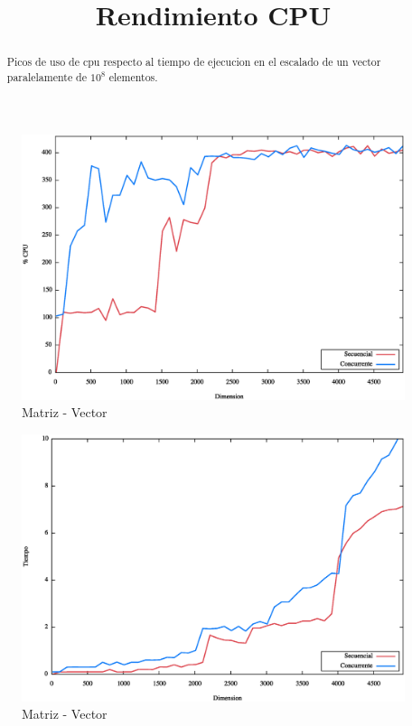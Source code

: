 
\title{Rendimiento CPU}


\maketitle
\begin{abstract}
    \centering
    Picos de uso de cpu respecto al tiempo de ejecucion en el escalado de un vector paralelamente de $10^8$ elementos.
\end{abstract}
\begin{figure}[!htb]
    \centering
    \includegraphics[scale=.5]{vectordimensioncpu.eps}
    \caption{Matriz - Vector}
    \label{fig:digraph}
\end{figure}
\begin{figure}[!htb]
    \centering
    \includegraphics[scale=.5]{vectordimensiontiempo.eps}
    \caption{Matriz - Vector}
    \label{fig:digraph}
\end{figure}
